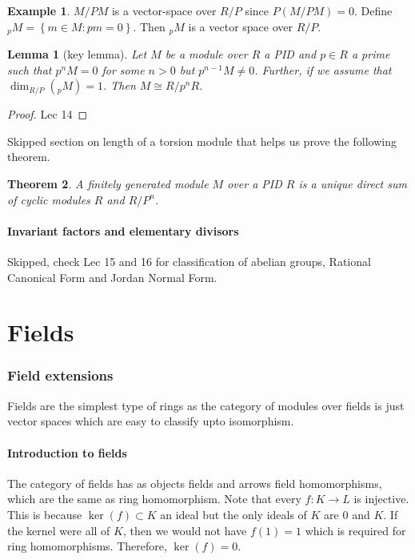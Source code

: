\documentclass{article}
\newtheorem{theorem}{Theorem}[section]
\newtheorem{lemma}[theorem]{Lemma}
\theoremstyle{definition}
\newtheorem{eg}{Example}[subsection]
\theoremstyle{remark}
\theoremstyle{plain}
\begin{document}
\begin{eg}
    \(M/PM\) is a vector-space over \(R/P\) since \(P (M/PM) = 0\). Define \(_{p}M = \left\{ m \in M: pm = 0 \right\}\). Then \(_{p}M\) is a vector space over \(R/P\).
\end{eg}

\begin{lemma}[key lemma]
    Let \(M\) be a module over \(R\) a PID and \(p\in R\) a prime such that \(p^nM = 0\) for some \(n > 0\) but \(p^{n-1}M \neq 0\). Further,
    if we assume that \(\dim _{R/P}(_{p}M) = 1\). Then \(M \cong R/p^nR\).
\end{lemma}
\begin{proof}
    Lec 14
\end{proof}

Skipped section on length of a torsion module that helps us prove the following theorem.

\begin{theorem}
    A finitely generated module \(M\) over a PID \(R\) is a unique direct sum of cyclic modules \(R\) and \(R/P^n\).
\end{theorem}

\subsection{Invariant factors and elementary divisors}

Skipped, check Lec 15 and 16 for classification of abelian groups, Rational Canonical Form and Jordan Normal Form. 

\newpage

\part{Fields}
\section{Field extensions}

Fields are the simplest type of rings as the category of modules over fields is just vector spaces which are easy to classify upto isomorphism. 
\subsection{Introduction to fields}

The category of fields has as objects fields and arrows field homomorphisms, which are the same as ring homomorphism. Note that every \(f: K \to L\) is injective. This is because \(\ker(f) \subset K\) an ideal but the only ideals of \(K\) are \(0\) and \(K\).
If the kernel were all of \(K\), then we would not have \(f(1) = 1\) which is required for ring homomorphisms. Therefore, \(\ker (f) = 0\).
\end{document}
